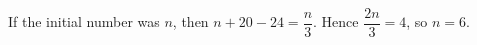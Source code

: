 If the initial number was $n$, then $n+20-24=\dfrac{n}{3}$. Hence $\dfrac{2n}{3}=4$, so $\boxed{n=6}$.
